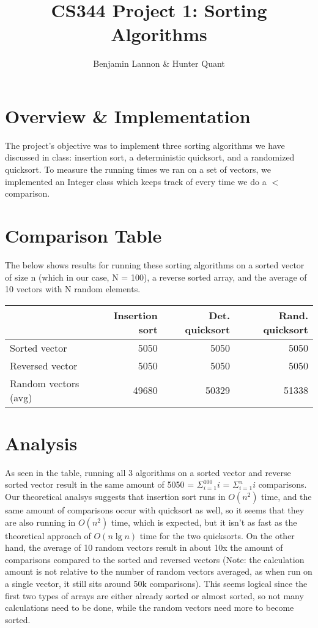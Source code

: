 \documentclass{article}
\title{CS344 Project 1: Sorting Algorithms}
\author{Benjamin Lannon \& Hunter Quant}
\begin{document}
\maketitle

\section{Overview \& Implementation}
The project's objective was to implement three sorting algorithms we have discussed in class: insertion sort, a deterministic quicksort, and a randomized quicksort. To measure the running times we ran on a set of vectors, we implemented an Integer class which keeps track of every time we do a $<$ comparison.

\section{Comparison Table}
The below shows results for running these sorting algorithms on a sorted vector of size n (which in our case, N = 100), a reverse sorted array, and the average of 10 vectors with N random elements.

\begin{center}
	\begin{tabular}{| l | r | r | r |}
	\hline
	& Insertion sort & Det. quicksort & Rand. quicksort \\ \hline
	Sorted vector & 5050 & 5050 & 5050 \\ \hline
	Reversed vector & 5050 & 5050 & 5050 \\ \hline
	Random vectors (avg) & 49680 & 50329 & 51338 \\
	\hline
	\end{tabular}
\end{center}

\section{Analysis}
As seen in the table, running all 3 algorithms on a sorted vector and reverse sorted  vector result in the same amount of 5050 = $\Sigma^{100}_{i=1}i$ = $\Sigma^n_{i=1}i$ comparisons. Our theoretical analsys suggests that insertion sort runs in $O(n^2)$ time, and the same amount of comparisons occur with quicksort as well, so it seems that they are also running in $O(n^2)$ time, which is expected, but it isn't as fast as the theoretical approach of $O(n\lg n)$ time for the two quicksorts. On the other hand, the average of 10 random vectors result in about 10x the amount of comparisons compared to the sorted and reversed vectors (Note: the calculation amount is not relative to the number of random vectors averaged, as when run on a single vector, it still sits around 50k comparisons). This seems logical since the first two types of arrays are either already sorted or almost sorted, so not many calculations need to be done, while the random vectors need more to become sorted.
\end{document}

